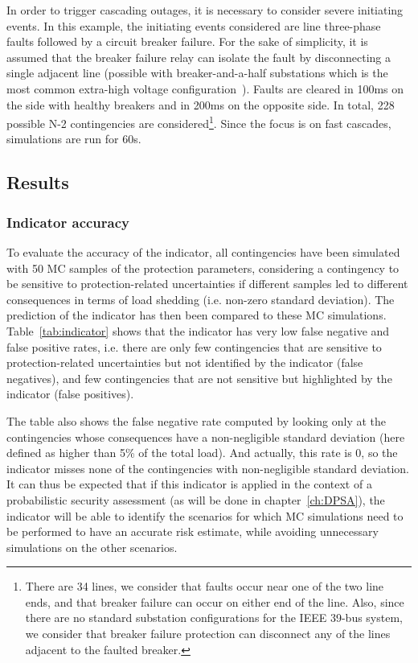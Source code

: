 In order to trigger cascading outages, it is necessary to consider severe initiating events. In this example, the initiating events considered are line three-phase faults followed by a circuit breaker failure. For the sake of simplicity, it is assumed that the breaker failure relay can isolate the fault by disconnecting a single adjacent line (possible with breaker-and-a-half substations which is the most common extra-high voltage configuration~\cite{HorowitzBook}). Faults are cleared in 100ms on the side with healthy breakers and in 200ms on the opposite side. In total, 228 possible N-2 contingencies are considered\footnote{There are 34 lines, we consider that faults occur near one of the two line ends, and that breaker failure can occur on either end of the line. Also, since there are no standard substation configurations for the IEEE 39-bus system, we consider that breaker failure protection can disconnect any of the lines adjacent to the faulted breaker.}. Since the focus is on fast cascades, simulations are run for 60s.


\subsection{Results}
\label{sec:protection_results}

\subsubsection{Indicator accuracy}

To evaluate the accuracy of the indicator, all contingencies have been simulated with 50 MC samples of the protection parameters, considering a contingency to be sensitive to protection-related uncertainties if different samples led to different consequences in terms of load shedding (i.e. non-zero standard deviation). The prediction of the indicator has then been compared to these MC simulations. Table~\ref{tab:indicator} shows that the indicator has very low false negative and false positive rates, i.e. there are only few contingencies that are sensitive to protection-related uncertainties but not identified by the indicator (false negatives), and few contingencies that are not sensitive but highlighted by the indicator (false positives).

The table also shows the false negative rate computed by looking only at the contingencies whose consequences have a non-negligible standard deviation (here defined as higher than 5\% of the total load). And actually, this rate is 0, so the indicator misses none of the contingencies with non-negligible standard deviation. It can thus be expected that if this indicator is applied in the context of a probabilistic security assessment (as will be done in chapter~\ref{ch:DPSA}), the indicator will be able to identify the scenarios for which MC simulations need to be performed to have an accurate risk estimate, while avoiding unnecessary simulations on the other scenarios.

